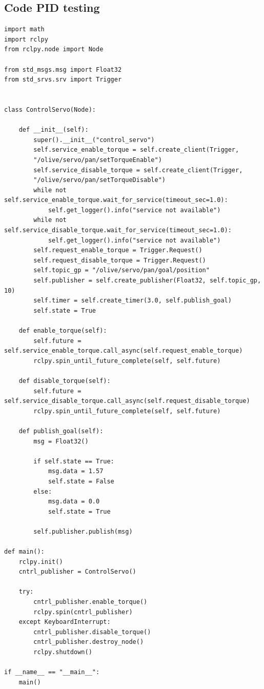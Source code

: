 \documentclass{article}
\begin{document}
\subsection{Code PID testing\label{pid_testing_code}}

\begin{verbatim}
import math
import rclpy
from rclpy.node import Node

from std_msgs.msg import Float32
from std_srvs.srv import Trigger


class ControlServo(Node):

    def __init__(self):
        super().__init__("control_servo")
        self.service_enable_torque = self.create_client(Trigger,
        "/olive/servo/pan/setTorqueEnable")
        self.service_disable_torque = self.create_client(Trigger,
        "/olive/servo/pan/setTorqueDisable")
        while not self.service_enable_torque.wait_for_service(timeout_sec=1.0):
            self.get_logger().info("service not available")
        while not self.service_disable_torque.wait_for_service(timeout_sec=1.0):
            self.get_logger().info("service not available")
        self.request_enable_torque = Trigger.Request()
        self.request_disable_torque = Trigger.Request()
        self.topic_gp = "/olive/servo/pan/goal/position"
        self.publisher = self.create_publisher(Float32, self.topic_gp, 10)
        self.timer = self.create_timer(3.0, self.publish_goal)
        self.state = True

    def enable_torque(self):
        self.future = self.service_enable_torque.call_async(self.request_enable_torque)
        rclpy.spin_until_future_complete(self, self.future)

    def disable_torque(self):
        self.future = self.service_disable_torque.call_async(self.request_disable_torque)
        rclpy.spin_until_future_complete(self, self.future)

    def publish_goal(self):
        msg = Float32()

        if self.state == True:
            msg.data = 1.57
            self.state = False
        else:
            msg.data = 0.0
            self.state = True

        self.publisher.publish(msg)

def main():
    rclpy.init()
    cntrl_publisher = ControlServo()
    
    try:
        cntrl_publisher.enable_torque()
        rclpy.spin(cntrl_publisher)
    except KeyboardInterrupt:
        cntrl_publisher.disable_torque()
        cntrl_publisher.destroy_node()
        rclpy.shutdown()

if __name__ == "__main__":
    main()
\end{verbatim}








\end{document}
